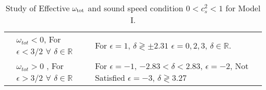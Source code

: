 \documentclass[a4paper,12pt]{article}
\begin{document}
\begin{table}[h!]
\begin{tabular}{|p{1cm}|p{8cm}|p{4.3cm}|}
\cline{2-3}
&$\omega_{tot}  < 0$, For $\epsilon < 3/2$ $\forall$ $ \delta \in \mathbb{R} $ & For $\epsilon = 1$, $\delta \gtrless \pm 2.31 $ \newline $\epsilon =0,2,3$, $\delta \in \mathbb{R}$. \\
\cline{2-3}
& $\omega_{tot} >0$ ,  For $\epsilon > 3/2$ $\forall$ $ \delta \in \mathbb{R} $ & For $\epsilon = -1$, $-2.83 <\delta < 2.83$, \newline
$ \epsilon = -2 $, Not Satisfied \newline 
$\epsilon = -3$, $\delta \gtrless 3.27$ \\
\hline
\end{tabular}
\caption{Study of Effective $ \omega_{\rm tot} $ and sound speed condition $ 0< c_s^2 <1 $ for Model I.}
\label{Model 01 : omega and sound speed} 
\end{table}
\end{document}
